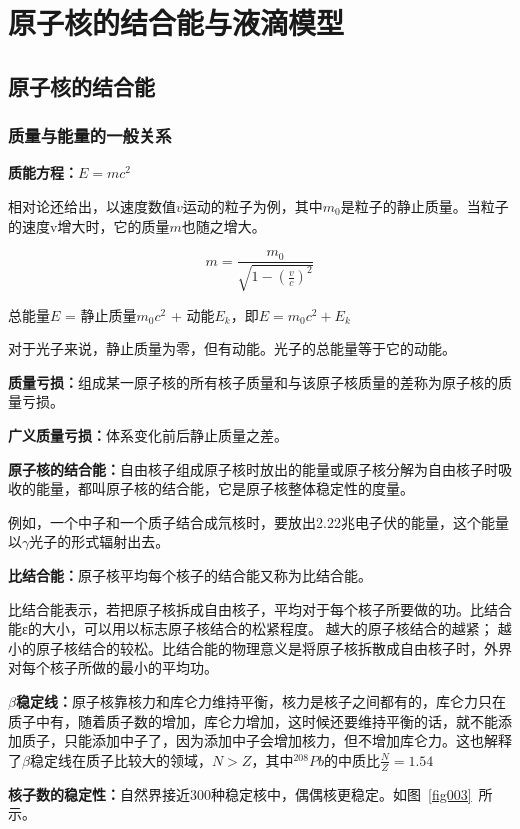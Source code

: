 \chapter{原子核的结合能与液滴模型}

\section{原子核的结合能}

\subsection{质量与能量的一般关系}

\textbf{质能方程：}$E=mc^2$

相对论还给出，以速度数值$v$运动的粒子为例，其中$m_0$是粒子的静止质量。当粒子的速度v增大时，它的质量$m$也随之增大。

$$ m = \frac{m_0}{\sqrt{ 1 - (\frac{v}{c})^2}} $$

总能量$E$ = 静止质量$m_0c^2$ + 动能$E_k$，即$E=m_0c^2 + E_k$

对于光子来说，静止质量为零，但有动能。光子的总能量等于它的动能。

\textbf{质量亏损：}组成某一原子核的所有核子质量和与该原子核质量的差称为原子核的质量亏损。

\textbf{广义质量亏损：}体系变化前后静止质量之差。

\textbf{原子核的结合能：}自由核子组成原子核时放出的能量或原子核分解为自由核子时吸收的能量，都叫原子核的结合能，它是原子核整体稳定性的度量。

例如，一个中子和一个质子结合成氘核时，要放出2.22兆电子伏的能量，这个能量以$\gamma$光子的形式辐射出去。

\textbf{比结合能：}原子核平均每个核子的结合能又称为比结合能。

比结合能表示，若把原子核拆成自由核子，平均对于每个核子所要做的功。比结合能ε的大小，可以用以标志原子核结合的松紧程度。越大的原子核结合的越紧；越小的原子核结合的较松。比结合能的物理意义是将原子核拆散成自由核子时，外界对每个核子所做的最小的平均功。

\textbf{$\beta$稳定线：}原子核靠核力和库仑力维持平衡，核力是核子之间都有的，库仑力只在质子中有，随着质子数的增加，库仑力增加，这时候还要维持平衡的话，就不能添加质子，只能添加中子了，因为添加中子会增加核力，但不增加库仑力。这也解释了$\beta$稳定线在质子比较大的领域，$N>Z$，其中$^{208}Pb$的中质比$\frac{N}{Z}=1.54$

\textbf{核子数的稳定性：}自然界接近300种稳定核中，偶偶核更稳定。如图~\ref{fig003}~所示。

